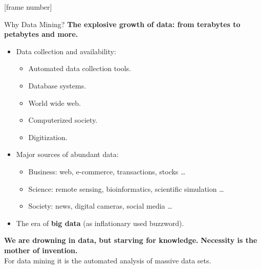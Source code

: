 \documentclass[aspectratio=169,t]{beamer}
\begin{document}
  {
    [frame number]
    \begin{frame}{Why Data Mining?}
    \textbf{The explosive growth of data: from terabytes to petabytes and more.}\\
        \begin{itemize}
            \item Data collection and availability:
                \begin{itemize}
                    \item Automated data collection tools.
                    \item Database systems.
                    \item World wide web.
                    \item Computerized society.
                    \item Digitization.
                \end{itemize}
            \item Major sources of abundant data:
                \begin{itemize}
                    \item Business: web, e-commerce, transactions, stocks \ldots
                    \item Science: remote sensing, bioinformatics, scientific simulation \ldots
                    \item Society: news, digital cameras, social media \ldots
                \end{itemize}
            \item The era of \textbf{big data} (as inflationary used buzzword).
        \end{itemize}
    \textbf{We are drowning in data, but starving for knowledge.} \textbf{Necessity is the mother of invention.}\\
    For data mining it is the automated analysis of massive data sets.
    \end{frame}
  }
\end{document}
